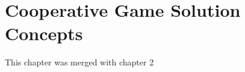 \setcounter{chapter}{3}

\chapter{Cooperative Game Solution Concepts}

This chapter was merged with chapter 2









